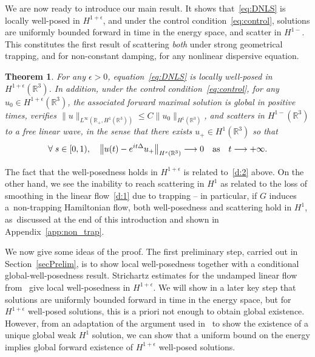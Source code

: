 \documentclass[10pt]{amsart}
\newtheorem{theo}{Theorem}[section]
\theoremstyle{definition}\newtheorem{defi}[theo]{Definition}\newtheorem{rema}[theo]{Remark}\newtheorem{exam}[theo]{Example}\newtheorem{exem}[theo]{Example}\newtheorem{nota}[theo]{Notation}
\newcommand*\R{\mathbb{R}}
\newcounter{setofstep}
\newcounter{step}[setofstep]
\renewcommand*{\to}{\mathchoice{\longrightarrow}{\rightarrow}{\rightarrow}{\rightarrow}}
\let\oldforall\forall
\renewcommand*{\forall}{\mathrel{\oldforall}}
\begin{document}
We are now ready to introduce our main result. It shows that~\eqref{eq:DNLS} is locally well-posed in $H^{1+\epsilon}$, and under the control condition~\eqref{eq:control}, solutions are uniformly bounded forward in time in the energy space, and scatter in $H^{1-}$. This constitutes the first result of scattering \emph{both} under strong geometrical trapping, and for non-constant damping, for any nonlinear dispersive equation.

\begin{theo}\label{thm:ScatDef}
For any $\epsilon>0$, equation~\eqref{eq:DNLS} is locally well-posed in $H^{1+\epsilon}(\R^3)$. In addition, under the control condition~\eqref{eq:control}, for any $u_0 \in H^{1+\epsilon}(\R^3)$, the associated forward maximal solution is global in positive times, verifies $\| u \|_{L^\infty(\R_+, H^1(\R^3))} \leq C \| u_0 \|_{H^1(\R^3)}$, and scatters in $H^{1-}(\R^3)$ to a free linear wave, in the sense that there exists $u_+ \in H^{1}(\R^3)$ so that
\[
\forall s\in[0, 1), \quad\left\| u(t) - e^{it\Delta} u_+ \right\|_{H^{s}(\R^3)} \to 0 \quad \text{as} \quad t \to + \infty.
\]
\end{theo}


The fact that the well-posedness holds in $H^{1+\epsilon}$ is related to~\eqref{d:2} above. On the other hand, we see the inability to reach scattering in $H^1$ as related to the loss of smoothing in the linear flow~\eqref{d:1} due to trapping -- in particular, if $G$ induces a~non-trapping Hamiltonian flow, both well-posedness and scattering hold in $H^1$, as~discussed at the end of this introduction and shown in Appendix~\ref{app:non_trap}.

We now give some ideas of the proof. The first preliminary step, carried out in Section~\ref{secPrelim}, is to show local well-posedness together with a conditional global-well-posedness result. Strichartz estimates for the undamped linear flow from~\cite{BuGeTz04} give local well-posedness in $H^{1+\epsilon}$. We will show in a later key step that solutions are uniformly bounded forward in time in the energy space, but for $H^{1+\epsilon}$ well-posed solutions, this is a priori not enough to obtain global existence. However, from an adaptation of the argument used in~\cite{BuGeTz04} to show the existence of a unique global weak $H^1$ solution, we can show that a uniform bound on the energy implies global forward existence of $H^{1+\epsilon}$ well-posed solutions.
\end{document}
